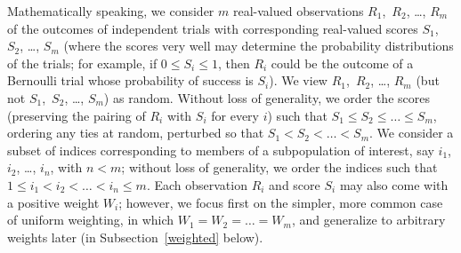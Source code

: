 \documentclass{article}
\begin{document}
Mathematically speaking,
we consider $m$ real-valued observations $R_1$,~$R_2$, \dots, $R_m$
of the outcomes of independent trials with corresponding real-valued scores
$S_1$,~$S_2$, \dots, $S_m$ (where the scores very well may determine
the probability distributions of the trials; for example,
if $0 \le S_i \le 1$, then $R_i$ could be the outcome of a Bernoulli trial
whose probability of success is $S_i$). We view $R_1$,~$R_2$, \dots, $R_m$
(but not $S_1$,~$S_2$, \dots, $S_m$) as random. Without loss of generality,
we order the scores (preserving the pairing of $R_i$ with $S_i$ for every $i$)
such that $S_1 \le S_2 \le \dots \le S_m$, ordering any ties at random,
perturbed so that $S_1 < S_2 < \dots < S_m$.
We consider a subset of indices corresponding to members
of a subpopulation of interest, say $i_1$, $i_2$, \dots, $i_n$, with $n < m$;
without loss of generality, we order the indices
such that $1 \le i_1 < i_2 < \dots < i_n \le m$.
Each observation $R_i$ and score $S_i$ may also come
with a positive weight $W_i$; however,
we focus first on the simpler, more common case of uniform weighting,
in which $W_1 = W_2 = \dots = W_m$, and generalize to arbitrary weights later
(in Subsection~\ref{weighted} below).
\end{document}
